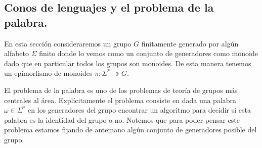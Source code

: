 \documentclass[tesis.tex]{subfiles}
\begin{document}
\begin{ej}


	
\end{ej}

%
%
%
%
%


\subsection{Conos de lenguajes y el problema de la palabra.}

En esta sección consideraremos un grupo $G$ finitamente generado por algún alfabeto $\Sigma$ finito donde lo vemos como un conjunto de generadores como monoide dado que en particular todos los grupos son monoides. 
De esta manera tenemos un epimorfismo de monoides $\pi: \Sigma^* \twoheadrightarrow  G$. 

El problema de la palabra es uno de los problemas de teoría de grupos más centrales al área. Explícitamente el problema consiste en dada una palabra $\omega \in \Sigma^*$ en los generadores del grupo encontrar un algoritmo para decidir si esta palabra es la identidad del grupo o no. Notemos que para poder pensar este problema estamos fijando de antemano algún conjunto de generadores posible del grupo.
\end{document}
